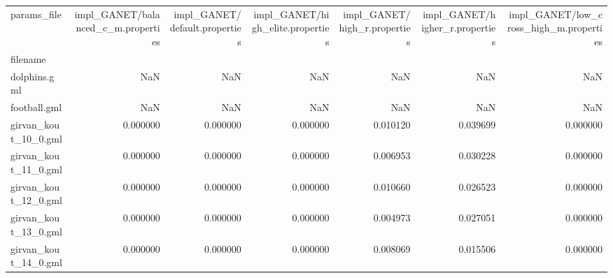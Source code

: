 \begin{tabular}{lrrrrrr}
\toprule
params\_file &  impl\_GANET/balanced\_c\_m.properties &  impl\_GANET/default.properties &  impl\_GANET/high\_elite.properties &  impl\_GANET/high\_r.properties &  impl\_GANET/higher\_r.properties &  impl\_GANET/low\_cross\_high\_m.properties \\
filename                   &                                     &                                &                                   &                               &                                 &                                         \\
\midrule
dolphins.gml               &                                 NaN &                            NaN &                               NaN &                           NaN &                             NaN &                                     NaN \\
football.gml               &                                 NaN &                            NaN &                               NaN &                           NaN &                             NaN &                                     NaN \\
girvan\_kout\_10\_0.gml       &                            0.000000 &                       0.000000 &                          0.000000 &                      0.010120 &                        0.039699 &                                0.000000 \\
girvan\_kout\_11\_0.gml       &                            0.000000 &                       0.000000 &                          0.000000 &                      0.006953 &                        0.030228 &                                0.000000 \\
girvan\_kout\_12\_0.gml       &                            0.000000 &                       0.000000 &                          0.000000 &                      0.010660 &                        0.026523 &                                0.000000 \\
girvan\_kout\_13\_0.gml       &                            0.000000 &                       0.000000 &                          0.000000 &                      0.004973 &                        0.027051 &                                0.000000 \\
girvan\_kout\_14\_0.gml       &                            0.000000 &                       0.000000 &                          0.000000 &                      0.008069 &                        0.015506 &                                0.000000 \\

\end{tabular}
